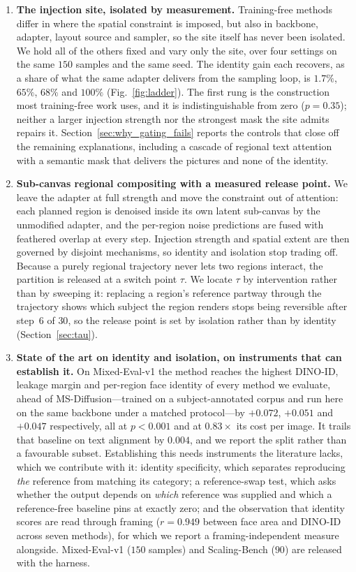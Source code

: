 \documentclass[review,10pt,times]{elsarticle}
\begin{document}
\begin{enumerate}

\item \textbf{The injection site, isolated by measurement.}
Training-free methods differ in where the spatial constraint is imposed, but
also in backbone, adapter, layout source and sampler, so the site itself has
never been isolated.  We hold all of the others fixed and vary only the site,
over four settings on the same $150$ samples and the same seed.  The identity
gain each recovers, as a share of what the same adapter delivers from the
sampling loop, is $1.7\%$, $65\%$, $68\%$ and $100\%$
(Fig.~\ref{fig:ladder}).  The first rung is the construction most
training-free work uses, and it is indistinguishable from zero
($p{=}0.35$); neither a larger injection strength nor the strongest mask the
site admits repairs it.  Section~\ref{sec:why_gating_fails} reports the
controls that close off the remaining explanations, including a cascade of
regional text attention with a semantic mask that delivers the pictures and
none of the identity.

\item \textbf{Sub-canvas regional compositing with a measured release point.}
We leave the adapter at full strength and move the constraint out of
attention: each planned region is denoised inside its own latent sub-canvas
by the unmodified adapter, and the per-region noise predictions are fused
with feathered overlap at every step.  Injection strength and spatial extent
are then governed by disjoint mechanisms, so identity and isolation stop
trading off.  Because a purely regional trajectory never lets two regions
interact, the partition is released at a switch point $\tau$.  We locate
$\tau$ by intervention rather than by sweeping it: replacing a region's
reference partway through the trajectory shows which subject the region
renders stops being reversible after step~$6$ of $30$, so the release point
is set by isolation rather than by identity (Section~\ref{sec:tau}).

\item \textbf{State of the art on identity and isolation, on instruments that
can establish it.}
On Mixed-Eval-v1 the method reaches the highest DINO-ID, leakage margin and
per-region face identity of every method we evaluate, ahead of
MS-Diffusion---trained on a subject-annotated corpus and run here on the same
backbone under a matched protocol---by $+0.072$, $+0.051$ and $+0.047$
respectively, all at $p{<}0.001$ and at $0.83\times$ its cost per image.  It
trails that baseline on text alignment by $0.004$, and we report the split
rather than a favourable subset.  Establishing this needs instruments the
literature lacks, which we contribute with it: identity specificity, which
separates reproducing \emph{the} reference from matching its category; a
reference-swap test, which asks whether the output depends on \emph{which}
reference was supplied and which a reference-free baseline pins at exactly
zero; and the observation that identity scores are read through framing
($r{=}0.949$ between face area and DINO-ID across seven methods), for which
we report a framing-independent measure alongside.  Mixed-Eval-v1 ($150$
samples) and Scaling-Bench ($90$) are released with the harness.


\end{enumerate}
\end{document}

